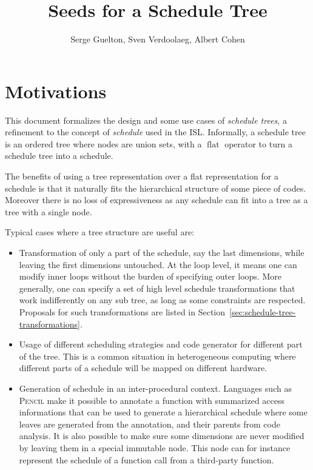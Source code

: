 \documentclass{article}
\title{Seeds for a Schedule Tree} %
\author{Serge Guelton, Sven Verdoolaeg, Albert Cohen}
\DeclareMathOperator\flaty{flat}
\begin{document}
\maketitle

\section*{Motivations}

This document formalizes the design and some use cases of \emph{schedule
trees}, a refinement to the concept of \emph{schedule} used in the \ac{ISL}.
Informally, a schedule tree is an ordered tree where nodes are union sets, with
a $\flaty$ operator to turn a schedule tree into a schedule.

The benefits of using a tree representation over a flat representation for a
schedule is that it naturally fits the hierarchical structure of some piece of
codes. Moreover there is no loss of expressiveness as any schedule can fit into
a tree as a tree with a single node.

Typical cases where a tree structure are useful are:

\begin{itemize}

    \item Transformation of only a part of the schedule, say the last
        dimensions, while leaving the first dimensions untouched. At the loop
        level, it means one can modify inner loops without the burden of
        specifying outer loops. More generally, one can specify a set of high
        level schedule transformations that work indifferently on any sub tree,
        as long as some constraints are respected. Proposals for such
        transformations are listed in
        Section~\ref{sec:schedule-tree-transformations}.

    \item Usage of different scheduling strategies and code generator for different
        part of the tree. This is a common situation in heterogeneous computing
        where different parts of a schedule will be mapped on different hardware.

    \item Generation of schedule in an inter-procedural context. Languages such
        as \textsc{Pencil} make it possible to annotate a function with
        summarized access informations that can be used to generate a
        hierarchical schedule where some leaves are generated from the
        annotation, and their parents from code analysis. It is also possible
        to make sure some dimensions are never modified by leaving them in a
        special immutable node. This node can for instance represent the
        schedule of a function call from a third-party function.

\end{itemize}
\end{document}
